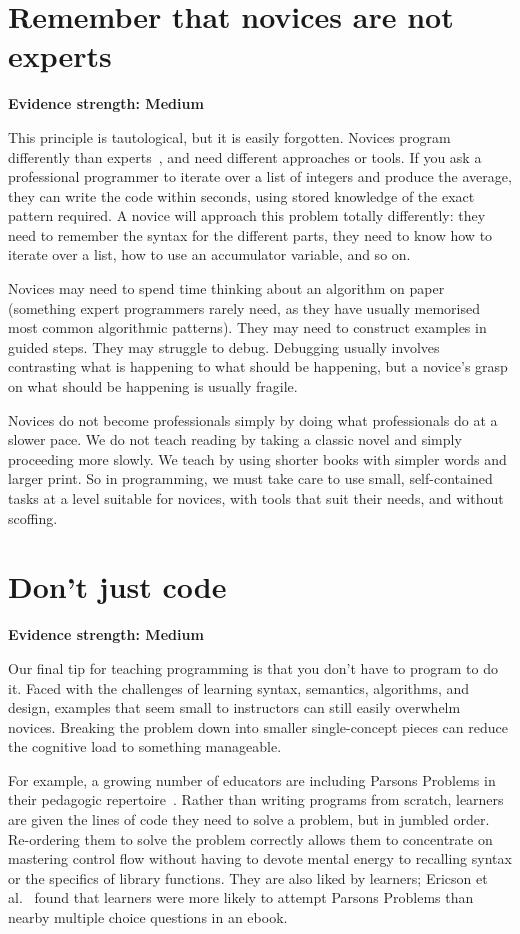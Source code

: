 \documentclass[10pt,letterpaper]{article}
\newcommand{\rulemajor}[2]{\section{#1}\label{#2}}
\newcommand{\evidence}[1]{\vspace{-0.3cm}\textbf{Evidence strength: #1}\vspace{0.5cm}}
\begin{document}
\rulemajor{Remember that novices are not experts}{not-experts}
\evidence{Medium}

This principle is tautological, but it is easily forgotten.
Novices program differently than experts~\cite{parnin-expertise},
and need different approaches or tools.
If you ask a professional programmer to iterate over a list of integers and produce the average,
they can write the code within seconds,
using stored knowledge of the exact pattern required.
A novice will approach this problem totally differently:
they need to remember the syntax for the different parts,
they need to know how to iterate over a list,
how to use an accumulator variable,
and so on.

Novices may need to spend time thinking about an algorithm on paper
(something expert programmers rarely need,
as they have usually memorised most common algorithmic patterns).
They may need to construct examples in guided steps.
They may struggle to debug.
Debugging usually involves contrasting what is happening to what should be happening,
but a novice's grasp on what should be happening is usually fragile.

Novices do not become professionals simply by doing what professionals do at a slower pace.
We do not teach reading by taking a classic novel and simply proceeding more slowly.
We teach by using shorter books with simpler words and larger print.
So in programming,
we must take care to use small, self-contained tasks at a level suitable for novices,
with tools that suit their needs, and without scoffing.

\rulemajor{Don't just code}{not-just-code}
\evidence{Medium}

Our final tip for teaching programming is that you don't have to program to do it.
Faced with the challenges of learning syntax, semantics, algorithms, and design,
examples that seem small to instructors can still easily overwhelm novices.
Breaking the problem down into smaller single-concept pieces
can reduce the cognitive load to something manageable.

For example,
a growing number of educators are including Parsons Problems
in their pedagogic repertoire~\cite{parsons,morrison-parsons}.
Rather than writing programs from scratch,
learners are given the lines of code they need to solve a problem,
but in jumbled order.
Re-ordering them to solve the problem correctly
allows them to concentrate on mastering control flow
without having to devote mental energy to recalling syntax
or the specifics of library functions.  They are also liked by learners; Ericson et al.~\cite{ericson-ebook} found
that learners were more likely to attempt Parsons Problems than nearby multiple choice questions in an ebook.
\end{document}
